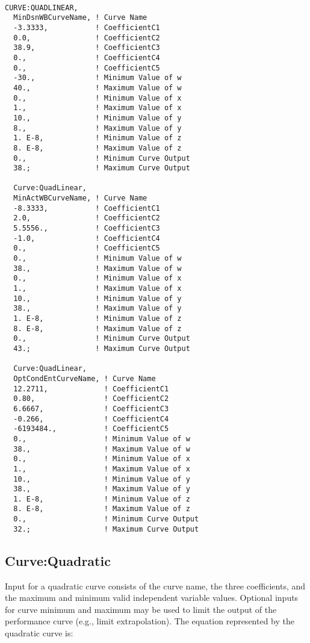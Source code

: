 \begin{lstlisting}

CURVE:QUADLINEAR,
  MinDsnWBCurveName, ! Curve Name
  -3.3333,           ! CoefficientC1
  0.0,               ! CoefficientC2
  38.9,              ! CoefficientC3
  0.,                ! CoefficientC4
  0.,                ! CoefficientC5
  -30.,              ! Minimum Value of w
  40.,               ! Maximum Value of w
  0.,                ! Minimum Value of x
  1.,                ! Maximum Value of x
  10.,               ! Minimum Value of y
  8.,                ! Maximum Value of y
  1. E-8,            ! Minimum Value of z
  8. E-8,            ! Maximum Value of z
  0.,                ! Minimum Curve Output
  38.;               ! Maximum Curve Output

  Curve:QuadLinear,
  MinActWBCurveName, ! Curve Name
  -8.3333,           ! CoefficientC1
  2.0,               ! CoefficientC2
  5.5556.,           ! CoefficientC3
  -1.0,              ! CoefficientC4
  0.,                ! CoefficientC5
  0.,                ! Minimum Value of w
  38.,               ! Maximum Value of w
  0.,                ! Minimum Value of x
  1.,                ! Maximum Value of x
  10.,               ! Minimum Value of y
  38.,               ! Maximum Value of y
  1. E-8,            ! Minimum Value of z
  8. E-8,            ! Maximum Value of z
  0.,                ! Minimum Curve Output
  43.;               ! Maximum Curve Output

  Curve:QuadLinear,
  OptCondEntCurveName, ! Curve Name
  12.2711,             ! CoefficientC1
  0.80,                ! CoefficientC2
  6.6667,              ! CoefficientC3
  -0.266,              ! CoefficientC4
  -6193484.,           ! CoefficientC5
  0.,                  ! Minimum Value of w
  38.,                 ! Maximum Value of w
  0.,                  ! Minimum Value of x
  1.,                  ! Maximum Value of x
  10.,                 ! Minimum Value of y
  38.,                 ! Maximum Value of y
  1. E-8,              ! Minimum Value of z
  8. E-8,              ! Maximum Value of z
  0.,                  ! Minimum Curve Output
  32.;                 ! Maximum Curve Output
\end{lstlisting}

\subsection{Curve:Quadratic}\label{curvequadratic}

Input for a quadratic curve consists of the curve name, the three coefficients, and the maximum and minimum valid independent variable values. Optional inputs for curve minimum and maximum may be used to limit the output of the performance curve (e.g., limit extrapolation). The equation represented by the quadratic curve is:

